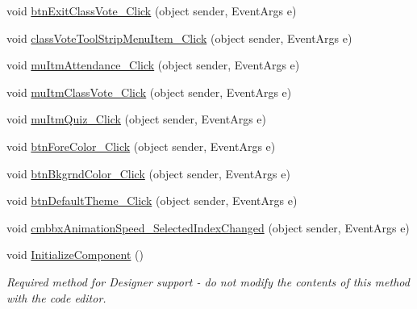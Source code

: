 \begin{DoxyCompactItemize}
\item 
void \hyperlink{class_sr_p___classroom_inq_1_1frm_classrrom_inq_a7de1b5ffee595dda863be7b2299e0e38}{btn\-Exit\-Class\-Vote\-\_\-\-Click} (object sender, \-Event\-Args e)
\item 
void \hyperlink{class_sr_p___classroom_inq_1_1frm_classrrom_inq_ac11a0a3ff559ed2ade5c661899ff300a}{class\-Vote\-Tool\-Strip\-Menu\-Item\-\_\-\-Click} (object sender, \-Event\-Args e)
\item 
void \hyperlink{class_sr_p___classroom_inq_1_1frm_classrrom_inq_a0901d9ca016f018ca62acc5dc4864171}{mu\-Itm\-Attendance\-\_\-\-Click} (object sender, \-Event\-Args e)
\item 
void \hyperlink{class_sr_p___classroom_inq_1_1frm_classrrom_inq_aefa97cd598657ba7e2f095570db36a28}{mu\-Itm\-Class\-Vote\-\_\-\-Click} (object sender, \-Event\-Args e)
\item 
void \hyperlink{class_sr_p___classroom_inq_1_1frm_classrrom_inq_ac5f95d502012ae69fb0b94d64709dbcc}{mu\-Itm\-Quiz\-\_\-\-Click} (object sender, \-Event\-Args e)
\item 
void \hyperlink{class_sr_p___classroom_inq_1_1frm_classrrom_inq_a52b78a0b5e0c3ec96fd0bea61c4d7d41}{btn\-Fore\-Color\-\_\-\-Click} (object sender, \-Event\-Args e)
\item 
void \hyperlink{class_sr_p___classroom_inq_1_1frm_classrrom_inq_a8b831d65094ba0fb57078609dec70be6}{btn\-Bkgrnd\-Color\-\_\-\-Click} (object sender, \-Event\-Args e)
\item 
void \hyperlink{class_sr_p___classroom_inq_1_1frm_classrrom_inq_a172ef16a523557b1225d32524bce6776}{btn\-Default\-Theme\-\_\-\-Click} (object sender, \-Event\-Args e)
\item 
void \hyperlink{class_sr_p___classroom_inq_1_1frm_classrrom_inq_a0a93893a224bd683a08e78c13bd44802}{cmbbx\-Animation\-Speed\-\_\-\-Selected\-Index\-Changed} (object sender, \-Event\-Args e)
\item 
void \hyperlink{class_sr_p___classroom_inq_1_1frm_classrrom_inq_a35e5cf3f9f2a335041a9f3810bb11ae2}{\-Initialize\-Component} ()
\begin{DoxyCompactList}\small\item\em \-Required method for \-Designer support -\/ do not modify the contents of this method with the code editor. \end{DoxyCompactList}\end{DoxyCompactItemize}
